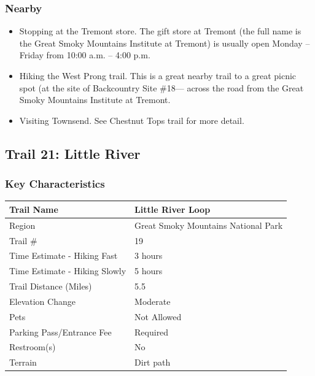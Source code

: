 \documentclass[
  letterpaper,
  DIV=11,
  numbers=noendperiod]{scrartcl}
\providecommand{\tightlist}{%
  \setlength{\itemsep}{0pt}\setlength{\parskip}{0pt}}\usepackage{longtable,booktabs,array}
\begin{document}
\hypertarget{nearby-19}{%
\subsubsection{Nearby}\label{nearby-19}}

\begin{itemize}
\tightlist
\item
  Stopping at the Tremont store. The gift store at Tremont (the full
  name is the Great Smoky Mountains Institute at Tremont) is usually
  open Monday -- Friday from 10:00 a.m. -- 4:00 p.m.
\item
  Hiking the West Prong trail. This is a great nearby trail to a great
  picnic spot (at the site of Backcountry Site \#18--- across the road
  from the Great Smoky Mountains Institute at Tremont.
\item
  Visiting Townsend. See Chestnut Tops trail for more detail.
\end{itemize}

\hypertarget{trail-21-little-river}{%
\subsection{Trail 21: Little River}\label{trail-21-little-river}}

\hypertarget{key-characteristics-20}{%
\subsubsection{Key Characteristics}\label{key-characteristics-20}}

\begin{longtable}[]{@{}ll@{}}
\toprule\noalign{}
Trail Name & Little River Loop \\
\midrule\noalign{}
\endhead
\bottomrule\noalign{}
\endlastfoot
Region & Great Smoky Mountains National Park \\
Trail \# & 19 \\
Time Estimate - Hiking Fast & 3 hours \\
Time Estimate - Hiking Slowly & 5 hours \\
Trail Distance (Miles) & 5.5 \\
Elevation Change & Moderate \\
Pets & Not Allowed \\
Parking Pass/Entrance Fee & Required \\
Restroom(s) & No \\
Terrain & Dirt path \\
\end{longtable}
\end{document}
